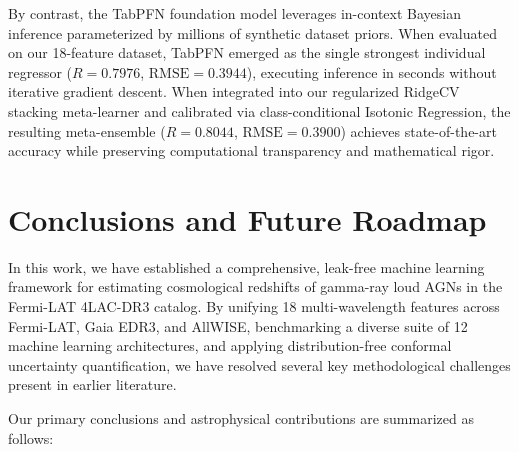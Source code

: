 \documentclass[twocolumn,linenumbers,floatfix]{aastex701}
\begin{document}
By contrast, the TabPFN foundation model \citep{Hollmann2022, Hollmann2025} leverages in-context Bayesian inference parameterized by millions of synthetic dataset priors. When evaluated on our 18-feature dataset, TabPFN emerged as the single strongest individual regressor ($R = 0.7976$, $\text{RMSE} = 0.3944$), executing inference in seconds without iterative gradient descent. When integrated into our regularized RidgeCV stacking meta-learner and calibrated via class-conditional Isotonic Regression, the resulting meta-ensemble ($R = 0.8044$, $\text{RMSE} = 0.3900$) achieves state-of-the-art accuracy while preserving computational transparency and mathematical rigor.

\section{Conclusions and Future Roadmap}
\label{sec:conclusions}

In this work, we have established a comprehensive, leak-free machine learning framework for estimating cosmological redshifts of gamma-ray loud AGNs in the Fermi-LAT 4LAC-DR3 catalog. By unifying 18 multi-wavelength features across Fermi-LAT, Gaia EDR3, and AllWISE, benchmarking a diverse suite of 12 machine learning architectures, and applying distribution-free conformal uncertainty quantification, we have resolved several key methodological challenges present in earlier literature.

Our primary conclusions and astrophysical contributions are summarized as follows:
\end{document}
